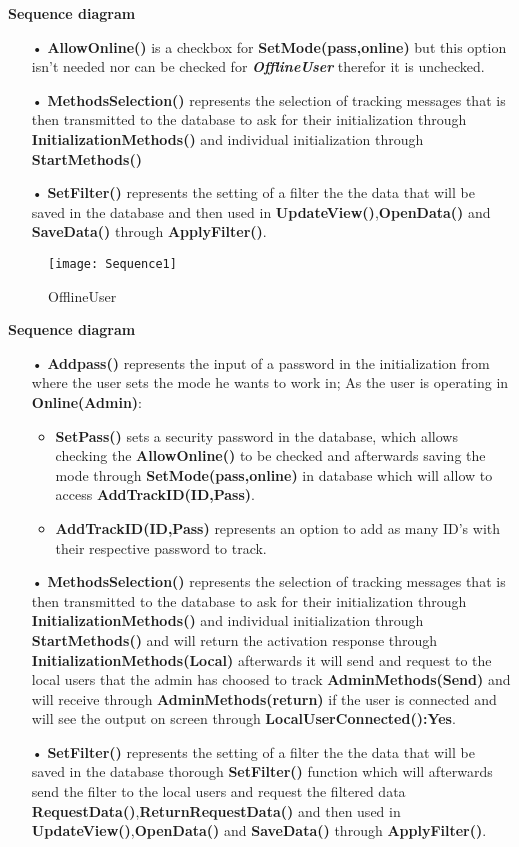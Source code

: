 \newpage
\textbf{Sequence diagram} 
\begin{itemize}
\item[•] \textbf{AllowOnline()} is a checkbox for \textbf{SetMode(pass,online)} but this option isn't needed nor can be checked for \textit{\textbf{OfflineUser}} therefor it is unchecked.
\item[•] \textbf{MethodsSelection()} represents the selection of tracking messages that is then transmitted to the database to ask for their initialization through \textbf{InitializationMethods()} and individual initialization through \textbf{StartMethods()}
\item[•] \textbf{SetFilter()} represents the setting of a filter the the data that will be saved in the database and then used in \textbf{UpdateView()},\textbf{OpenData()} and \textbf{SaveData()} through \textbf{ApplyFilter()}.
\end{itemize}
\newpage
\begin{figure}[!h]
	\centering
	\texttt{[image: Sequence1]}
	\caption{OfflineUser} 
\end{figure}
\newpage 
\textbf{Sequence diagram} 
\begin{itemize}
\item[•] \textbf{Addpass()} represents the input of a password in the initialization from where the user sets the mode he wants to work in; As the user is operating in \textbf{Online(Admin)}:
\begin{itemize}
\item \textbf{SetPass()} sets a security password in the database, which allows checking the \textbf{AllowOnline()} to be checked and afterwards saving the mode through \textbf{SetMode(pass,online)} in database which will allow to access \textbf{AddTrackID(ID,Pass)}.
\
\item \textbf{AddTrackID(ID,Pass)} represents an option to add as many ID's with their respective password to track.
\end{itemize}
\item[•] \textbf{MethodsSelection()} represents the selection of tracking messages that is then transmitted to the database to ask for their initialization through \textbf{InitializationMethods()} and individual initialization through \textbf{StartMethods()} and will return the activation response through \textbf{InitializationMethods(Local)} afterwards it will send and request to the local users that the admin has choosed to track \textbf{AdminMethods(Send)} and will receive through \textbf{AdminMethods(return)} if the user is connected and will see the output on screen through \textbf{LocalUserConnected():Yes}.
\item[•] \textbf{SetFilter()} represents the setting of a filter the the data that will be saved in the database thorough \textbf{SetFilter()} function which will afterwards send the filter to the local users and request the filtered data \textbf{RequestData()},\textbf{ReturnRequestData()} and then used in \textbf{UpdateView()},\textbf{OpenData()} and \textbf{SaveData()} through \textbf{ApplyFilter()}.
\end{itemize}
